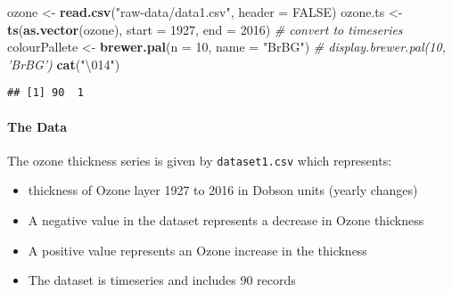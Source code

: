 \documentclass[]{article}
\newenvironment{Shaded}{\begin{snugshade}}{\end{snugshade}}
\newcommand{\CharTok}[1]{\textcolor[rgb]{0.31,0.60,0.02}{#1}}
\newcommand{\CommentTok}[1]{\textcolor[rgb]{0.56,0.35,0.01}{\textit{#1}}}
\newcommand{\DataTypeTok}[1]{\textcolor[rgb]{0.13,0.29,0.53}{#1}}
\newcommand{\DecValTok}[1]{\textcolor[rgb]{0.00,0.00,0.81}{#1}}
\newcommand{\KeywordTok}[1]{\textcolor[rgb]{0.13,0.29,0.53}{\textbf{#1}}}
\newcommand{\NormalTok}[1]{#1}
\newcommand{\OperatorTok}[1]{\textcolor[rgb]{0.81,0.36,0.00}{\textbf{#1}}}
\newcommand{\OtherTok}[1]{\textcolor[rgb]{0.56,0.35,0.01}{#1}}
\newcommand{\StringTok}[1]{\textcolor[rgb]{0.31,0.60,0.02}{#1}}
\providecommand{\tightlist}{%
  \setlength{\itemsep}{0pt}\setlength{\parskip}{0pt}}
\let\oldparagraph\paragraph
\renewcommand{\paragraph}[1]{\oldparagraph{#1}\mbox{}}
\begin{document}
\begin{Shaded}
\begin{Highlighting}[]
\NormalTok{ozone <-}\StringTok{ }\KeywordTok{read.csv}\NormalTok{(}\StringTok{"raw-data/data1.csv"}\NormalTok{, }\DataTypeTok{header =} \OtherTok{FALSE}\NormalTok{)}
\NormalTok{ozone.ts <-}\StringTok{ }\KeywordTok{ts}\NormalTok{(}\KeywordTok{as.vector}\NormalTok{(ozone), }\DataTypeTok{start =} \DecValTok{1927}\NormalTok{, }\DataTypeTok{end =} \DecValTok{2016}\NormalTok{) }\CommentTok{# convert to timeseries}
\NormalTok{colourPallete <-}\StringTok{ }\KeywordTok{brewer.pal}\NormalTok{(}\DataTypeTok{n =} \DecValTok{10}\NormalTok{, }\DataTypeTok{name =} \StringTok{"BrBG"}\NormalTok{)}
\CommentTok{# display.brewer.pal(10, 'BrBG')}
\KeywordTok{cat}\NormalTok{(}\StringTok{"}\CharTok{\textbackslash{}014}\StringTok{"}\NormalTok{)}
\end{Highlighting}
\end{Shaded}



\begin{Shaded}
\end{Shaded}

\begin{verbatim}
## [1] 90  1
\end{verbatim}

\hypertarget{the-data}{%
\paragraph{The Data}\label{the-data}}

The ozone thickness series is given by \texttt{dataset1.csv} which
represents:

\begin{itemize}
\tightlist
\item
  thickness of Ozone layer 1927 to 2016 in Dobson units (yearly changes)
\item
  A negative value in the dataset represents a decrease in Ozone
  thickness
\item
  A positive value represents an Ozone increase in the thickness
\item
  The dataset is timeseries and includes 90 records
\end{itemize}
\end{document}
